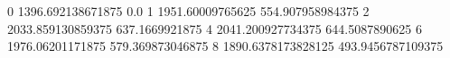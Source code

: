 0 1396.692138671875 0.0
1 1951.60009765625 554.907958984375
2 2033.859130859375 637.1669921875
4 2041.200927734375 644.5087890625
6 1976.06201171875 579.369873046875
8 1890.6378173828125 493.9456787109375
